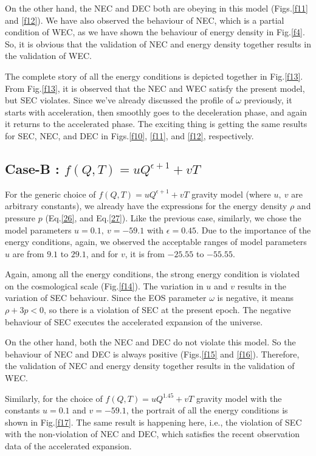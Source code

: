 \documentclass[aps,prd,showpacs,nofootinbib,floats,floatfix,preprintnumbers,groupedaddress,twocolumn]{revtex4-1}
\def \e{\epsilon}
\def \o{\omega}
\def \r{\rho}
\begin{document}
    On the other hand, the NEC and DEC both are obeying in this model (Figs.\ref{f11} and \ref{f12}). We have also observed the behaviour of NEC, which is a partial condition of WEC, as we have shown the behaviour of energy density in Fig.\ref{f4}. So, it is obvious that the validation of NEC and energy density together results in the validation of WEC.

    The complete story of all the energy conditions is depicted together in Fig.\ref{f13}. From Fig.\ref{f13}, it is observed that the NEC and WEC satisfy the present model, but SEC violates. Since we've already discussed the profile of $\o$ previously, it starts with acceleration, then smoothly goes to the deceleration phase, and again it returns to the accelerated phase. The exciting thing is getting the same results for SEC, NEC, and DEC in Figs.\ref{f10}, \ref{f11}, and \ref{f12}, respectively.




\subsection{Case-B : $f(Q,T)=uQ^{\e+1}+v T$}
\noindent
    For the generic choice of $f(Q,T)=u Q^{\e+1} +v T$ gravity model (where $u,~v$ are arbitrary constants), we already have the expressions for the energy density $\r$ and pressure $p$ (Eq.\eqref{26}, and Eq.\eqref{27}). Like the previous case, similarly, we chose the model parameters $u=0.1,~v=-59.1$ with $\e=0.45$. Due to the importance of the energy conditions, again, we observed the acceptable ranges of model parameters $u$ are from $9.1$ to $29.1$, and for $v$, it is from $-25.55$ to $-55.55$.

    Again, among all the energy conditions, the strong energy condition is violated on the cosmological scale (Fig.\ref{f14}). The variation in $u$ and $v$ results in the variation of SEC behaviour. Since the EOS parameter $\o$ is negative, it means $\r+3p<0$, so there is a violation of SEC at the present epoch. The negative behaviour of SEC executes the accelerated expansion of the universe. 
    
    On the other hand, both the NEC and DEC do not violate this model. So the behaviour of NEC and DEC is always positive (Figs.\ref{f15} and \ref{f16}). Therefore, the validation of NEC and energy density together results in the validation of WEC.

    Similarly, for the choice of $f(Q,T)=uQ^{1.45}+vT$ gravity model with the constants $u=0.1$ and $v=-59.1$, the portrait of all the energy conditions is shown in Fig.\ref{f17}. The same result is happening here, i.e., the violation of SEC with the non-violation of NEC and DEC, which satisfies the recent observation data of the accelerated expansion.
\end{document}
